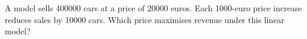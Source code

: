 A model sells 400000 cars at a price of 20000 euros. Each 1000-euro price increase reduces sales by 10000 cars. Which price maximises revenue under this linear model?
